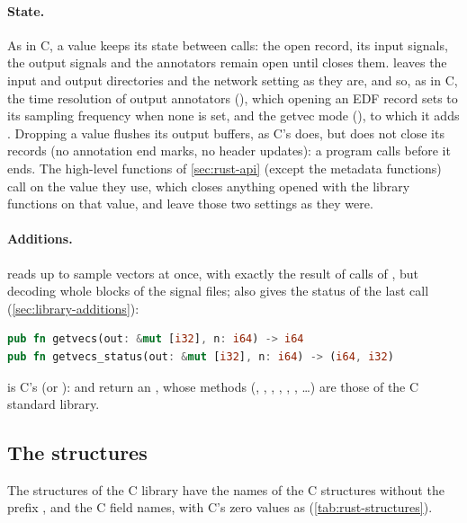 \paragraph{State.} As in C, a  value keeps its state between calls: the open
record, its input signals, the output signals and the annotators remain open until
 closes them.  leaves the input and output directories
and the network setting as they are, and so, as in C, the time resolution of output
annotators (), which opening an EDF record sets to its sampling frequency
when none is set, and the getvec mode (), to which it adds
. Dropping a  value flushes its output buffers, as C's
 does, but does not close its records (no annotation end marks, no
header updates): a program calls  before it ends. The
high-level functions of \cref{sec:rust-api} (except the metadata functions) call
 on the  value they use, which closes anything opened with the
library functions on that value, and leave those two settings as they were.

\paragraph{Additions.}  reads up to  sample vectors at
once, with exactly the result of  calls of , but decoding whole
blocks of the signal files;  also gives the status of
the last  call (\cref{sec:library-additions}):
\begin{lstlisting}[language=Rust]
pub fn getvecs(out: &mut [i32], n: i64) -> i64
pub fn getvecs_status(out: &mut [i32], n: i64) -> (i64, i32)
\end{lstlisting}
 is C's  (or ):  and
 return an , whose methods (,
, , , , , \ldots) are those of
the C standard library.

\subsection{The structures}
\label{sec:rust-structures}

The structures of the C library have the names of the C structures without the prefix
, and the C field names, with C's zero values as 
(\cref{tab:rust-structures}).

